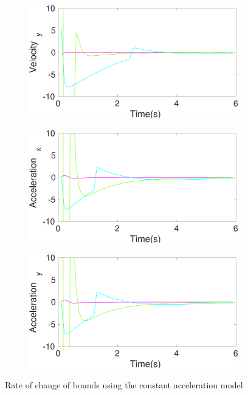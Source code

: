 \begin{figure}[!h]
\begin{subfigure}{.5\linewidth}
\end{subfigure}
\begin{subfigure}{.5\linewidth}
\centering
\includegraphics[width=\linewidth]{figures/BoundChange/CA/ca_bound_changeVelocity_y}
\end{subfigure}
\begin{subfigure}{.5\linewidth}
\centering
\includegraphics[width=\linewidth]{figures/BoundChange/CA/ca_bound_changeAcceleration_x}
\end{subfigure}
\begin{subfigure}{.5\linewidth}
\centering
\includegraphics[width=\linewidth]{figures/BoundChange/CA/ca_bound_changeAcceleration_y}
\end{subfigure}
\caption{Rate of change of bounds using the constant acceleration model}
\end{figure}

